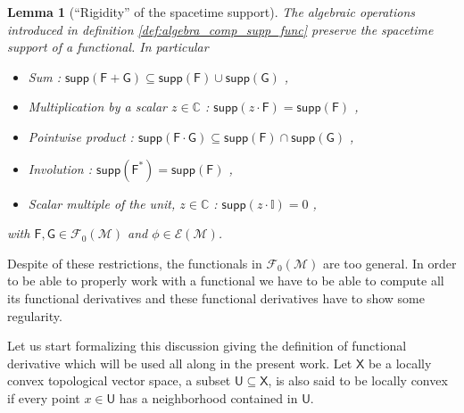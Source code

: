 \documentclass[11pt]{book}
\newcommand{\supp}{\mathsf{supp}}
\newcommand{\Ecal}{\mathcal{E}}
\newcommand{\Fcal}{\mathcal{F}}
\newcommand{\Mcal}{\mathcal{M}}
\newcommand{\Cbb}{\mathbb{C}}
\newcommand{\Ibb}{\mathbb{I}}
\newcommand{\Fsf}{\mathsf{F}}
\newcommand{\Gsf}{\mathsf{G}}
\newcommand{\Usf}{\mathsf{U}}
\newcommand{\Xsf}{\mathsf{X}}
\theoremstyle{break}
\newtheorem{lemma}{Lemma}[chapter]
\begin{document}
\begin{lemma}[``Rigidity'' of the spacetime support]
The algebraic operations introduced in definition \ref{def:algebra_comp_supp_func} preserve the spacetime support of a functional. In particular
%
\begin{itemize}
\item Sum : $\supp(\Fsf + \Gsf) \subseteq \supp(\Fsf) \cup \supp(\Gsf)$ ,
\item Multiplication by a scalar $z\in\Cbb$ : $\supp(z\cdot\Fsf) = \supp(\Fsf)$ ,
\item Pointwise product : $\supp(\Fsf \cdot \Gsf) \subseteq \supp(\Fsf) \cap \supp(\Gsf)$ ,
\item Involution : $\supp(\Fsf^\ast) = \supp(\Fsf)$ ,
\item Scalar multiple of the unit, $z\in\Cbb$ : $\supp(z\cdot\Ibb) = 0 $ ,
\end{itemize}
%
with $\Fsf, \Gsf \in \Fcal_0(\Mcal)$ and $\phi \in \Ecal(\Mcal)$.
\end{lemma}


Despite of these restrictions, the functionals in $\Fcal_0(\Mcal)$ are too general. In order to be able to properly work with a functional we have to be able to compute all its functional derivatives and these functional derivatives have to show some regularity.


Let us start formalizing this discussion giving the definition of functional derivative which will be used all along in the present work. Let $\Xsf$ be a locally convex topological vector space, a subset $\Usf \subseteq \Xsf$, is also said to be locally convex if every point $x \in \Usf$ has a neighborhood contained in $\Usf$. 
\end{document}
